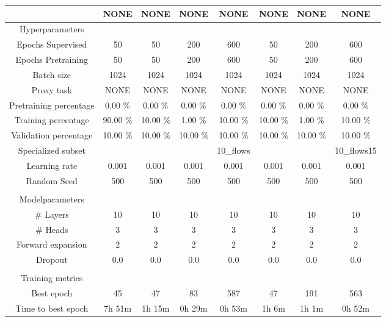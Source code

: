 \begin{table}[htb]
    \centering
    \begin{tabular}{@{}cccccccc@{}}
        \toprule
         &  NONE &  NONE &  NONE &  NONE &  NONE &  NONE &  NONE \\
        \midrule
        Hyperparameters &  &  &  &  &  &  &  \\
        Epochs Supervised &  50 &  50 &  200 &  600 &  50 &  200 &  600 \\
        Epochs Pretraining &  50 &  50 &  200 &  600 &  50 &  200 &  600 \\
        Batch size &  1024 &  1024 &  1024 &  1024 &  1024 &  1024 &  1024 \\
        Proxy task &  NONE &  NONE &  NONE &  NONE &  NONE &  NONE &  NONE \\
        Pretraining percentage &  0.00 \% &  0.00 \% &  0.00 \% &  0.00 \% &  0.00 \% &  0.00 \% &  0.00 \% \\
        Training percentage &  90.00 \% &  10.00 \% &  1.00 \% &  10.00 \% &  10.00 \% &  1.00 \% &  10.00 \% \\
        Validation percentage &  10.00 \% &  10.00 \% &  10.00 \% &  10.00 \% &  10.00 \% &  10.00 \% &  10.00 \% \\
        Specialized subset &   &   &   &  10\_flows &   &   &  10\_flows15 \\
        Learning rate &  0.001 &  0.001 &  0.001 &  0.001 &  0.001 &  0.001 &  0.001 \\
        Random Seed &  500 &  500 &  500 &  500 &  500 &  500 &  500 \\
         \\
        Modelparameters &  &  &  &  &  &  &  \\
        \# Layers &  10 &  10 &  10 &  10 &  10 &  10 &  10 \\
        \# Heads &  3 &  3 &  3 &  3 &  3 &  3 &  3 \\
        Forward expansion &  2 &  2 &  2 &  2 &  2 &  2 &  2 \\
        Dropout &  0.0 &  0.0 &  0.0 &  0.0 &  0.0 &  0.0 &  0.0 \\
         \\
        Training metrics &  &  &  &  &  &  &  \\
        Best epoch &  45 &  47 &  83 &  587 &  47 &  191 &  563 \\
        Time to best epoch &  7h 51m &  1h 15m &  0h 29m &  0h 53m &  1h 6m &  1h 1m &  0h 52m \\

\end{tabular}
\end{table}
